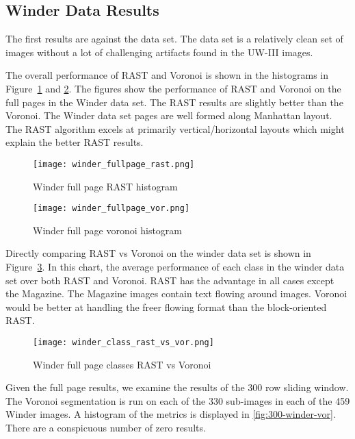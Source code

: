 \documentclass[conference]{IEEEtran}
\begin{document}
%
%
\subsection{Winder Data Results}

The first results are against the \cite{IEEEhowto:Winder} data set. The
\cite{IEEEhowto:Winder} data set is a relatively clean set of images without a
lot of challenging artifacts found in the UW-III images.

The overall performance of RAST and Voronoi is shown in the histograms in
Figure~\ref{fig:winder-fullpage-rast} and \ref{fig:winder-fullpage-vor}. The figures
show the performance of RAST and Voronoi on the full pages in the Winder
data set. The RAST results are slightly better than the Voronoi. The Winder
data set pages are well formed along Manhattan layout. The RAST algorithm
excels at primarily vertical/horizontal layouts which might explain the better
RAST results.

\begin{figure}[winder-fullpage-rast]
\texttt{[image: winder\_fullpage\_rast.png]}
\caption{Winder full page RAST histogram}
\label{fig:winder-fullpage-rast}
\end{figure}

\begin{figure}[winder-fullpage-vor]
\texttt{[image: winder\_fullpage\_vor.png]}
\caption{Winder full page voronoi histogram}
\label{fig:winder-fullpage-vor}
\end{figure}

Directly comparing RAST vs Voronoi on the winder data set is shown in
Figure~\ref{fig:winder-class-rast-vs-vor}. In this chart, the average
performance of each class in the winder data set over both RAST and Voronoi.
RAST has the advantage in all cases except the Magazine. The Magazine images
contain text flowing around images. Voronoi would be better at handling the
freer flowing format than the block-oriented RAST.

\begin{figure}[winder-class-rast-vs-vor]
\texttt{[image: winder\_class\_rast\_vs\_vor.png]}
\caption{Winder full page classes RAST vs Voronoi}
\label{fig:winder-class-rast-vs-vor}
\end{figure}

Given the full page results, we examine the results of the 300 row sliding
window. The Voronoi segmentation is run on each of the 330 sub-images in each of
the 459 Winder images. A histogram of the metrics is displayed in
\ref{fig:300-winder-vor}. There are a conspicuous number of zero results. 
\end{document}
